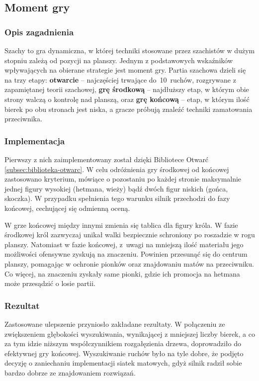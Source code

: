 \subsection{Moment gry}
\label{subsec:moment-gry}

\subsubsection{Opis zagadnienia}
Szachy to gra dynamiczna, w której techniki stosowane przez szachistów w dużym stopniu zależą od pozycji na planszy.
Jednym z podstawowych wskaźników wpływających na obierane strategie jest moment gry.
Partia szachowa dzieli się na trzy etapy: \textbf{otwarcie} – najczęściej trwające do~10~ruchów, rozgrywane z zapamiętanej teorii szachowej, \textbf{grę środkową} – najdłuższy etap, w którym obie strony walczą o kontrolę nad planszą, oraz \textbf{grę końcową} – etap, w którym ilość bierek po obu stronach jest niska, a gracze próbują znaleźć techniki zamatowania przeciwnika.

\subsubsection{Implementacja}
Pierwszy z nich zaimplementowany został dzięki Bibliotece Otwarć \ref{subsec:biblioteka-otwarc}.
W celu odróżnienia gry środkowej od końcowej zastosowano kryterium, mówiące o pozostaniu po każdej stronie maksymalnie jednej figury wysokiej (hetmana, wieży) bądź dwóch figur niskich (gońca, skoczka).
W przypadku spełnienia tego warunku silnik przechodzi do fazy końcowej, cechującej się odmienną oceną.

W grze końcowej między innymi zmienia się tablica dla figury króla.
W fazie środkowej król zazwyczaj unikał walki bezpiecznie schroniony po roszadzie w rogu planszy.
Natomiast w fazie końcowej, z~uwagi na mniejszą ilość materiału jego możliwości ofensywne zyskują na znaczeniu.
Powinien przesunąć się do centrum planszy, pomagając w ochronie pionków oraz znajdowaniu matów na przeciwniku.
Co więcej, na znaczeniu zyskały same pionki, gdzie ich promocja na hetmana może przesądzić o losie partii.

\subsubsection{Rezultat}
Zastosowane ulepszenie przyniosło zakładane rezultaty.
W połączeniu ze zwiększeniem głębokości wyszukiwania, wynikającej z mniejszej liczby bierek, a co za tym idzie niższym współczynnikiem rozgałęzienia drzewa, doprowadziło do efektywnej gry końcowej.
Wyszukiwanie ruchów było na tyle dobre, że podjęto decyzję o zaniechaniu implementacji siatek matowych, gdyż silnik radził sobie bardzo dobrze ze znajdowaniem rozwiązań.